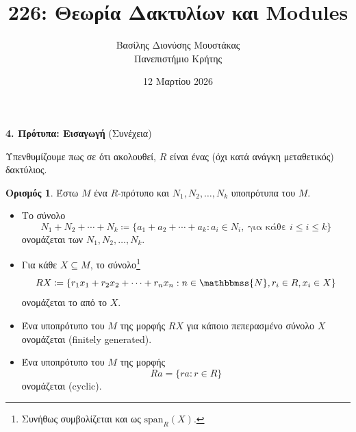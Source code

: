 \documentclass[12pt,a4paper,reqno]{amsart}
\title{226: Θεωρία Δακτυλίων και Modules}
\author[Β.~Δ. Μουστακας]{Βασίλης Διονύσης Μουστάκας \\ Πανεπιστήμιο Κρήτης}
\date{12 Μαρτίου 2026}
\theoremstyle{definition}
\newtheorem{definition}[theorem]{Ορισμός}
\theoremstyle{remark}
\numberwithin{theorem}{section}
\numberwithin{exercise}{section}
\numberwithin{equation}{section}
\newcommand{\NN}{\mathbbmss{N}}
\newcommand{\rmspan}{\mathrm{span}}
\newcommand{\defn}[1]{{\color{mylightblue}{#1}}}
\begin{document}
\begingroup
\def\uppercasenonmath#1{} %
\let\MakeUppercase\relax %
\maketitle
\endgroup

\setcounter{section}{4}
\setcounter{theorem}{12}
\begin{center}
    \textbf{4. Πρότυπα: Εισαγωγή
} (Συνέχεια)
\end{center}

Υπενθυμίζουμε πως σε ότι ακολουθεί, $R$ είναι ένας (όχι κατά ανάγκη μεταθετικός) δακτύλιος.

\begin{definition}
    \label{def:generators_sum}
    Έστω $M$ ένα $R$-πρότυπο και $N_1, N_2, \dots, N_k$ υποπρότυπα του $M$.
    \begin{itemize}
        \item Το σύνολο 
        \[
        N_1 + N_2 + \cdots + N_k \coloneqq \{a_1 + a_2 + \cdots + a_k : a_i \in N_i, \ \text{για κάθε $i \le i \le k$}\}
        \]
        ονομάζεται \defn{άθροισμα} των $N_1, N_2, \dots, N_k$.
        \item  Για κάθε $X \subseteq M$, το σύνολο\footnote{Συνήθως συμβολίζεται και ως $\rmspan_R(X)$.} 
        \[
        RX \coloneqq \{r_1x_1 + r_2x_2 + \cdots + r_nx_n : n \in \NN, r_i \in R, x_i \in X\}
        \]
        ονομάζεται το \defn{υποπρότυπο που παράγεται} από το $X$.
        \item Ένα υποπρότυπο του $M$ της μορφής $RX$ για κάποιο πεπερασμένο σύνολο $X$ ονομάζεται \defn{πεπερασμένα παραγόμενο} (finitely generated).
        \item Ένα υποπρότυπο του $M$ της μορφής 
        \[
        Ra = \{ra : r \in R\}
        \]
        ονομάζεται \defn{κυκλικό} (cyclic).
    \end{itemize}
\end{definition}
\end{document}
